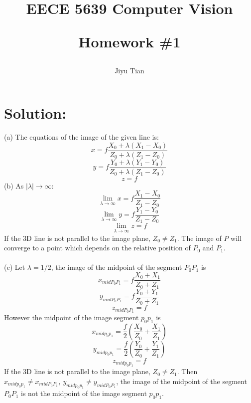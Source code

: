 \documentclass[12pt]{article}
\title{EECE 5639 Computer Vision\\ [2ex] \begin{large} Homework \#1 \end{large} }
\author{Jiyu Tian}
\date{}
\begin{document}
\maketitle
\section{Solution:}
(a) The equations of the image of the given line is:
\begin{equation*}
x = f\frac{X_0 + \lambda(X_1 - X_0)}{Z_0 + \lambda(Z_1 - Z_0)}
\end{equation*}
\begin{equation*}
y = f\frac{Y_0 + \lambda(Y_1 - Y_0)}{Z_0 + \lambda(Z_1 - Z_0)}
\end{equation*}
\begin{equation*}
z = f
\end{equation*}
\noindent(b) As $|\lambda| \to \infty$:
\begin{equation*}
\lim\limits_{\lambda\to\infty}x = f\frac{X_1 - X_0}{Z_1 - Z_0}
\end{equation*}
\begin{equation*}
\lim\limits_{\lambda\to\infty}y = f\frac{Y_1 - Y_0}{Z_1 - Z_0}
\end{equation*}
\begin{equation*}
\lim\limits_{\lambda\to\infty}z = f
\end{equation*}
\noindent If the 3D line is not parallel to the image plane, $Z_0 \neq Z_1$. The image of $P$ will converge to a point which depends on the relative position of $P_0$ and $P_1$.\\\\
(c) Let $\lambda = 1/2$, the image of the midpoint of the segment $P_0P_1$ is 
\begin{equation*}
x_{midP_0P_1} = f\frac{X_0 + X_1}{Z_0 + Z_1}
\end{equation*}
\begin{equation*}
y_{midP_0P_1} = f\frac{Y_0 + Y_1}{Z_0 + Z_1}
\end{equation*}
\begin{equation*}
z_{midP_0P_1} = f
\end{equation*}
\noindent However the midpoint of the image segment $p_0p_1$ is
\begin{equation*}
x_{midp_0p_1} = \frac{f}{2}\left ( \frac{X_0}{Z_0} + \frac{X_1}{Z_1} \right )
\end{equation*}
\begin{equation*}
y_{midp_0p_1} = \frac{f}{2}\left ( \frac{Y_0}{Z_0} + \frac{Y_1}{Z_1} \right )
\end{equation*}
\begin{equation*}
z_{midp_0p_1} = f
\end{equation*}
\noindent If the 3D line is not parallel to the image plane, $Z_0 \neq Z_1$. Then $x_{midp_0p_1} \neq x_{midP_0P_1},\ y_{midp_0p_1} \neq y_{midP_0P_1}$,  the image of the midpoint of the segment $P_0P_1$ is not the midpoint of the image segment $p_0p_1$.
\end{document}
